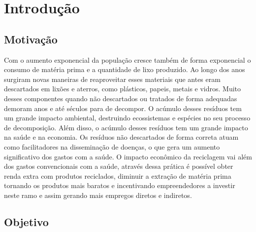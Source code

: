 \documentclass[
	12pt,				%
	openright,			%
	twoside,			%
	a4paper,			%
	english,			%
	french,				%
	spanish,			%
	brazil				%
	]{abntex2}
\begin{document}


\tableofcontents*
\cleardoublepage




\textual





\chapter{Introdução}
\section{Motivação}
Com o aumento exponencial da população cresce também de forma exponencial o consumo de matéria prima e a quantidade de lixo produzido. Ao longo dos anos surgiram novas maneiras de reaproveitar esses materiais que antes eram descartados em lixões e aterros, como plásticos, papeis, metais e vidros. Muito desses componentes quando não descartados ou tratados de forma adequadas demoram anos e até séculos para de decompor. O acúmulo desses resíduos tem um grande impacto ambiental, destruindo ecossistemas e espécies no seu processo de decomposição. Além disso, o acúmulo desses resíduos tem um grande impacto na saúde e na economia. Os resíduos não descartados de forma correta atuam como facilitadores na disseminação de doenças, o que gera um aumento significativo dos gastos com a saúde. O impacto econômico da reciclagem vai além dos gastos convencionais com a saúde, através dessa prática é possível obter renda extra com produtos reciclados, diminuir a extração de matéria prima tornando os produtos mais baratos e incentivando empreendedores a investir neste ramo e assim gerando mais empregos diretos e indiretos. 
\section{Objetivo}
\end{document}
